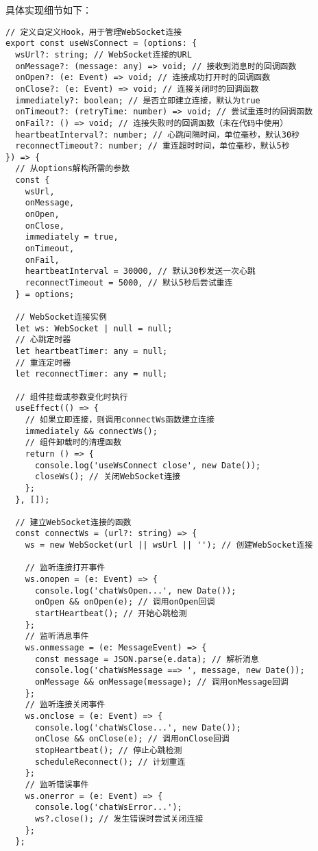 \documentclass[12pt,a4paper]{article}
\begin{document}
\begin{CJK*}{UTF8}{gbsn}
具体实现细节如下：
\begin{mdframed}
\begin{verbatim}
// 定义自定义Hook，用于管理WebSocket连接
export const useWsConnect = (options: {
  wsUrl?: string; // WebSocket连接的URL
  onMessage?: (message: any) => void; // 接收到消息时的回调函数
  onOpen?: (e: Event) => void; // 连接成功打开时的回调函数
  onClose?: (e: Event) => void; // 连接关闭时的回调函数
  immediately?: boolean; // 是否立即建立连接，默认为true
  onTimeout?: (retryTime: number) => void; // 尝试重连时的回调函数
  onFail?: () => void; // 连接失败时的回调函数（未在代码中使用）
  heartbeatInterval?: number; // 心跳间隔时间，单位毫秒，默认30秒
  reconnectTimeout?: number; // 重连超时时间，单位毫秒，默认5秒
}) => {
  // 从options解构所需的参数
  const {
    wsUrl,
    onMessage,
    onOpen,
    onClose,
    immediately = true,
    onTimeout,
    onFail,
    heartbeatInterval = 30000, // 默认30秒发送一次心跳
    reconnectTimeout = 5000, // 默认5秒后尝试重连
  } = options;

  // WebSocket连接实例
  let ws: WebSocket | null = null;
  // 心跳定时器
  let heartbeatTimer: any = null;
  // 重连定时器
  let reconnectTimer: any = null;

  // 组件挂载或参数变化时执行
  useEffect(() => {
    // 如果立即连接，则调用connectWs函数建立连接
    immediately && connectWs();
    // 组件卸载时的清理函数
    return () => {
      console.log('useWsConnect close', new Date());
      closeWs(); // 关闭WebSocket连接
    };
  }, []);

  // 建立WebSocket连接的函数
  const connectWs = (url?: string) => {
    ws = new WebSocket(url || wsUrl || ''); // 创建WebSocket连接

    // 监听连接打开事件
    ws.onopen = (e: Event) => {
      console.log('chatWsOpen...', new Date());
      onOpen && onOpen(e); // 调用onOpen回调
      startHeartbeat(); // 开始心跳检测
    };
    // 监听消息事件
    ws.onmessage = (e: MessageEvent) => {
      const message = JSON.parse(e.data); // 解析消息
      console.log('chatWsMessage ==> ', message, new Date());
      onMessage && onMessage(message); // 调用onMessage回调
    };
    // 监听连接关闭事件
    ws.onclose = (e: Event) => {
      console.log('chatWsClose...', new Date());
      onClose && onClose(e); // 调用onClose回调
      stopHeartbeat(); // 停止心跳检测
      scheduleReconnect(); // 计划重连
    };
    // 监听错误事件
    ws.onerror = (e: Event) => {
      console.log('chatWsError...');
      ws?.close(); // 发生错误时尝试关闭连接
    };
  };


\end{verbatim}
\end{mdframed}
\end{CJK*}
\end{document}

